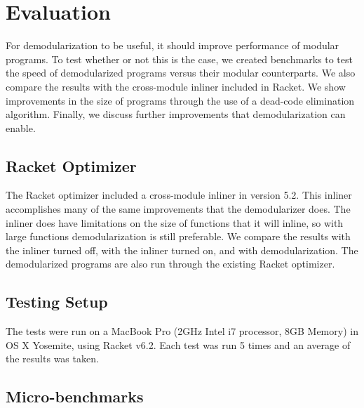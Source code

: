 \chapter{Evaluation}
\label{chap:evaluation}

For demodularization to be useful, it should improve performance of modular programs.
To test whether or not this is the case, we created benchmarks to test the speed of demodularized programs versus their modular counterparts.
We also compare the results with the cross-module inliner included in Racket.
We show improvements in the size of programs through the use of a dead-code elimination algorithm.
Finally, we discuss further improvements that demodularization can enable.

\section{Racket Optimizer}

The Racket optimizer included a cross-module inliner in version 5.2. 
This inliner accomplishes many of the same improvements that the demodularizer does.
The inliner does have limitations on the size of functions that it will inline, so with large functions demodularization is still preferable.
We compare the results with the inliner turned off, with the inliner turned on, and with demodularization.
The demodularized programs are also run through the existing Racket optimizer.

\section{Testing Setup}

The tests were run on a MacBook Pro (2GHz Intel i7 processor, 8GB Memory) in OS X Yosemite, using Racket v6.2. 
Each test was run 5 times and an average of the results was taken.

\section{Micro-benchmarks}

